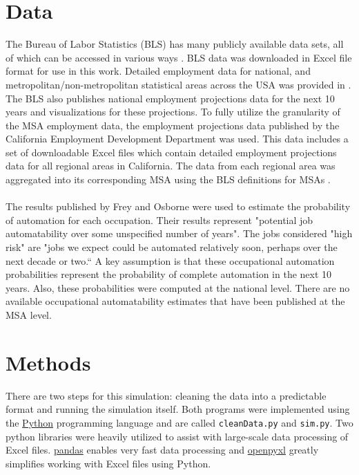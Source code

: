 \documentclass[10pt]{article}
\begin{document}
\section{Data}
The Bureau of Labor Statistics (BLS) has many publicly available data sets, all of which can be accessed in various ways \cite{BLSGuide}. BLS data was downloaded in Excel file format for use in this work. Detailed employment data for national, and metropolitan/non-metropolitan statistical areas across the USA was provided in \cite{BLSOESData}. The BLS also publishes national employment projections data \cite{BLSEmploymentProjectionsData} for the next 10 years and visualizations \cite{BLSNationalProjections} for these projections. To fully utilize the granularity of the MSA employment data, the employment projections data published by the California Employment Development Department \cite{CAEmploymentProjections} was used. This data includes a set of downloadable Excel files which contain detailed employment projections data for all regional areas in California. The data from each regional area was aggregated into its corresponding MSA using the BLS definitions for MSAs \cite{BLSOESMSA_DEF}.\\\\ The results published by Frey and Osborne \cite{FreyOsborneAutomation} were used to estimate the probability of automation for each occupation. Their results represent "potential job automatability over some unspecified number of years". The jobs considered "high risk" are "jobs we expect could be automated relatively soon, perhaps over the next decade or two.“ A key assumption is that these occupational automation probabilities represent the probability of complete automation in the next 10 years. Also, these probabilities were computed at the national level. There are no available occupational automatability estimates that have been published at the MSA level.

\section{Methods}
There are two steps for this simulation: cleaning the data into a predictable format and running the simulation itself. Both programs were implemented using the \href{https://www.python.org/}{Python} programming language  and are called \texttt{cleanData.py} and \texttt{sim.py}. Two python libraries were heavily utilized to assist with large-scale data processing of Excel files. \href{https://pandas.pydata.org/}{pandas} enables very fast data processing and \href{https://openpyxl.readthedocs.io/en/stable/index.html}{openpyxl} greatly simplifies working with Excel files using Python.
\end{document}
